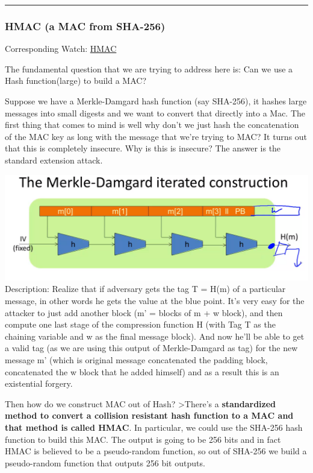 \documentclass[11pt]{article}
\makeatletter
\def\maxwidth{\ifdim\Gin@nat@width>\linewidth\linewidth
    \else\Gin@nat@width\fi}
\let\Oldincludegraphics\includegraphics
\renewcommand{\includegraphics}[1]{\Oldincludegraphics[width=.8\maxwidth]{#1}}
\makeatother
\begin{document}
\begin{center}\rule{0.5\linewidth}{\linethickness}\end{center}

    \hypertarget{hmac-a-mac-from-sha-256}{%
\subsubsection{HMAC (a MAC from
SHA-256)}\label{hmac-a-mac-from-sha-256}}

Corresponding Watch:
\href{https://www.coursera.org/learn/crypto/lecture/OjMrT/hmac}{HMAC}

The fundamental question that we are trying to address here is: Can we
use a Hash function(large) to build a MAC?

Suppose we have a Merkle-Damgard hash function (say SHA-256), it hashes
large messages into small digests and we want to convert that directly
into a Mac. The first thing that comes to mind is well why don't we just
hash the concatenation of the MAC key as long with the message that
we're trying to MAC? It turns out that this is completely insecure. Why
is this is insecure? The answer is the standard extension attack.

\includegraphics{./Images/MDExtensionAttack.png} Description: Realize
that if adversary gets the tag T = H(m) of a particular message, in
other words he gets the value at the blue point. It's very easy for the
attacker to just add another block (m' = blocks of m + w block), and
then compute one last stage of the compression function H (with Tag T as
the chaining variable and w as the final message block). And now he'll
be able to get a valid tag (as we are using this output of
Merkle-Damgard as tag) for the new message m' (which is original message
concatenated the padding block, concatenated the w block that he added
himself) and as a result this is an existential forgery.

Then how do we construct MAC out of Hash? \textgreater{}There's a
\textbf{standardized method to convert a collision resistant hash
function to a MAC and that method is called HMAC}. In particular, we
could use the SHA-256 hash function to build this MAC. The output is
going to be 256 bits and in fact HMAC is believed to be a pseudo-random
function, so out of SHA-256 we build a pseudo-random function that
outputs 256 bit outputs.
\end{document}
